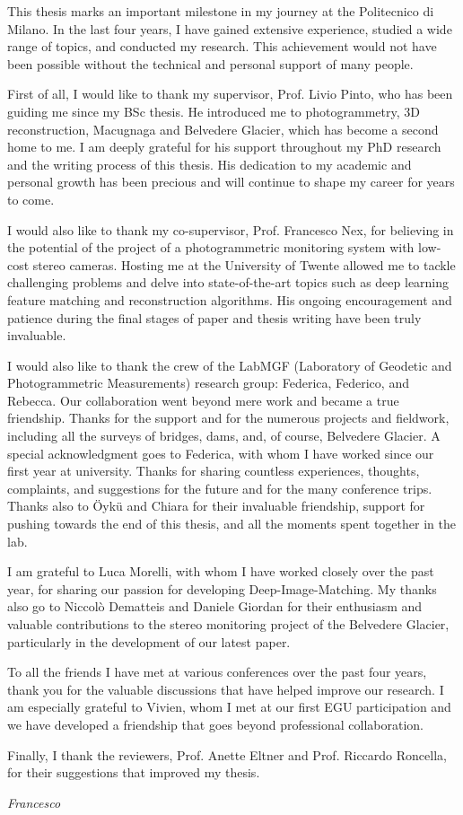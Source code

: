 This thesis marks an important milestone in my journey at the Politecnico di Milano. 
In the last four years, I have gained extensive experience, studied a wide range of topics, and conducted my research. 
This achievement would not have been possible without the technical and personal support of many people.

First of all, I would like to thank my supervisor, Prof. Livio Pinto, who has been guiding me since my BSc thesis. 
He introduced me to photogrammetry, 3D reconstruction, Macugnaga and Belvedere Glacier, which has become a second home to me. 
I am deeply grateful for his support throughout my PhD research and the writing process of this thesis.
His dedication to my academic and personal growth has been precious and will continue to shape my career for years to come.

I would also like to thank my co-supervisor, Prof. Francesco Nex, for believing in the potential of the project of a photogrammetric monitoring system with low-cost stereo cameras.
Hosting me at the University of Twente allowed me to tackle challenging problems and delve into state-of-the-art topics such as deep learning feature matching and reconstruction algorithms. 
His ongoing encouragement and patience during the final stages of paper and thesis writing have been truly invaluable.

I would also like to thank the crew of the LabMGF (Laboratory of Geodetic and Photogrammetric Measurements) research group: Federica, Federico, and Rebecca. 
Our collaboration went beyond mere work and became a true friendship. 
Thanks for the support and for the numerous projects and fieldwork, including all the surveys of bridges, dams, and, of course, Belvedere Glacier.
A special acknowledgment goes to Federica, with whom I have worked since our first year at university.
Thanks for sharing countless experiences, thoughts, complaints, and suggestions for the future and for the many conference trips.
Thanks also to Öykü and Chiara for their invaluable friendship, support for pushing towards the end of this thesis, and all the moments spent together in the lab.

I am grateful to Luca Morelli, with whom I have worked closely over the past year, for sharing our passion for developing Deep-Image-Matching.
My thanks also go to Niccolò Dematteis and Daniele Giordan for their enthusiasm and valuable contributions to the stereo monitoring project of the Belvedere Glacier, particularly in the development of our latest paper.

To all the friends I have met at various conferences over the past four years, thank you for the valuable discussions that have helped improve our research. 
I am especially grateful to Vivien, whom I met at our first EGU participation and we have developed a friendship that goes beyond professional collaboration.

Finally, I thank the reviewers, Prof. Anette Eltner and Prof. Riccardo Roncella, for their suggestions that improved my thesis.

\vspace{1pt}

\begin{flushright}
    \textit{Francesco}
\end{flushright}